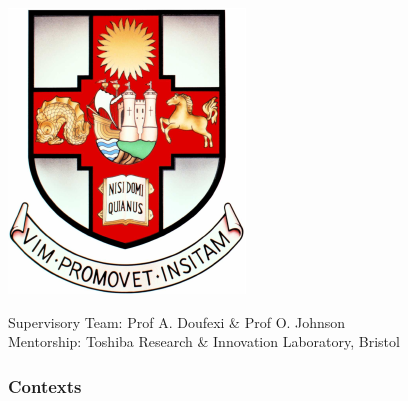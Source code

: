 
\begin{frame}
\titlepage 
\vspace*{-1cm}
\begin{center}
\includegraphics[width=0.13\linewidth]{preambule/logos/bristolcrest_colour.pdf}
\end{center}
\vspace{-0.32cm}
{\small
Supervisory Team: Prof A. Doufexi \& Prof O. Johnson\\
Mentorship: Toshiba Research \& Innovation Laboratory, Bristol}
\end{frame}


\begin{frame}
\frametitle{Contexts} 
\tableofcontents 
\end{frame}

